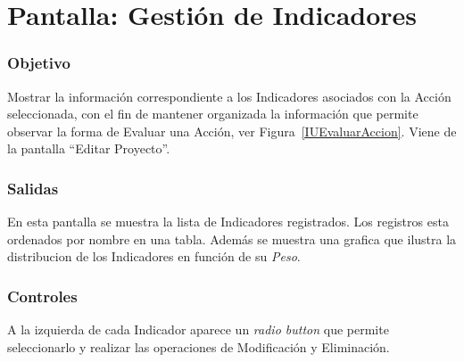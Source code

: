 \section{Pantalla: Gestión de Indicadores}

\subsubsection{Objetivo}
Mostrar la información correspondiente a los Indicadores asociados con la Acción seleccionada, con el fin de mantener organizada la información que permite observar la forma de Evaluar una Acción, ver Figura~\ref{IUEvaluarAccion}. Viene de la pantalla ``Editar Proyecto''.


\subsubsection{Salidas}
En esta pantalla se muestra la lista de Indicadores registrados. Los registros esta ordenados por nombre en una tabla. Además se muestra una grafica que ilustra la distribucion de los Indicadores en función de su \textit{Peso}.

\subsubsection{Controles}

A la izquierda de cada Indicador aparece un {\em radio button} que permite seleccionarlo y realizar las operaciones de Modificación y Eliminación.

